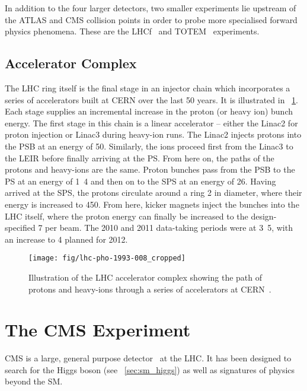 In addition to the four larger detectors, two smaller experiments lie upstream
of the \ac{ATLAS} and \ac{CMS} collision points in order to probe more
specialised forward physics phenomena. These are the
\ac{LHCf}~\cite{lhcf_proposal} and \ac{TOTEM}~\cite{totem_proposal} experiments.

\subsection{Accelerator Complex}
The \ac{LHC} ring itself is the final stage in an injector chain which
incorporates a series of accelerators built at CERN over the last 50 years. It
is illustrated in \fig~\ref{fig:expt_lhc}. Each stage supplies an incremental
increase in the proton (or heavy ion) bunch energy. The first stage in this
chain is a linear accelerator -- either the Linac2 for proton injection or
Linac3 during heavy-ion runs. The Linac2 injects protons into the \ac{PSB} at an
energy of \unit{50}{\mega\electronvolt}. Similarly, the ions proceed first from
the Linac3 to the \ac{LEIR} before finally arriving at the \ac{PS}. From here
on, the paths of the protons and heavy-ions are the same. Proton bunches pass
from the \ac{PSB} to the \ac{PS} at an energy of \unit{1.4}{\giga\electronvolt}
and then on to the \ac{SPS} at an energy of
\unit{26}{\giga\electronvolt}. Having arrived at the \ac{SPS}, the protons
circulate around a ring \unit{2}{\kilo\metre} in diameter, where their energy is
increased to \unit{450}{\giga\electronvolt}. From here, kicker magnets inject
the bunches into the \ac{LHC} itself, where the proton energy can finally be
increased to the design-specified \unit{7}{\TeV} per beam. The 2010 and 2011
data-taking periods were at \unit{3.5}{\TeV}, with an increase to \unit{4}{\TeV}
planned for 2012.

\begin{figure}[h!]
\texttt{[image: fig/lhc-pho-1993-008\_cropped]}
\caption[Illustration of the \acs{LHC} accelerator complex]{Illustration of the
  \ac{LHC} accelerator complex showing the path of protons and heavy-ions
  through a series of accelerators at \ac{CERN}~\cite{lhc_injection}.}
\label{fig:expt_lhc}
\end{figure}

\section{The \acl{CMS} Experiment}
\label{sec:cms}
\ac{CMS} is a large, general purpose detector~\cite{cms_jinst} at the
\ac{LHC}. It has been designed to search for the Higgs boson (see
\sec~\ref{sec:sm_higgs}) as well as signatures of physics beyond the \ac{SM}.

